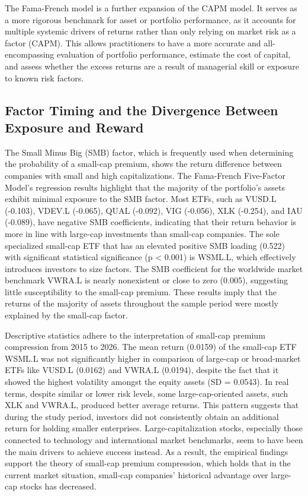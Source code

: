 \documentclass[12pt]{article}
\begin{document}
The Fama-French model is a further expansion of the CAPM model. It serves as a more rigorous benchmark for asset or portfolio performance, as it accounts for multiple systemic drivers of returns rather than only relying on market risk as a factor (CAPM). This allows practitioners to have a more accurate and all-encompassing evaluation of portfolio performance, estimate the cost of capital, and assess whether the excess returns are a result of managerial skill or exposure to known risk factors.


\subsection{Factor Timing and the Divergence Between Exposure and Reward}

The Small Minus Big (SMB) factor, which is frequently used when determining the probability of a small-cap premium, shows the return difference between companies with small and high capitalizations. The Fama-French Five-Factor Model's regression results highlight that the majority of the portfolio's assets exhibit minimal exposure to the SMB factor. Most ETFs, such as VUSD.L (-0.103), VDEV.L (-0.065), QUAL (-0.092), VIG (-0.056), XLK (-0.254), and IAU (-0.089), have negative SMB coefficients, indicating that their return behavior is more in line with large-cap investments than small-cap companies. The sole specialized small-cap ETF that has an elevated positive SMB loading (0.522) with significant statistical significance (p < 0.001) is WSML.L, which effectively introduces investors to size factors. The SMB coefficient for the worldwide market benchmark VWRA.L is nearly nonexistent or close to zero (0.005), suggesting little susceptibility to the small-cap premium. These results imply that the returns of the majority of assets throughout the sample period were mostly explained by the small-cap factor.

Descriptive statistics adhere to the interpretation of small-cap premium compression from 2015 to 2026. The mean return (0.0159) of the small-cap ETF WSML.L was not significantly higher in comparison of large-cap or broad-market ETFs like VUSD.L (0.0162) and VWRA.L (0.0194), despite the fact that it showed the highest volatility amongst the equity assets (SD = 0.0543). In real terms, despite similar or lower risk levels, some large-cap-oriented assets, such XLK and VWRA.L, produced better average returns. This pattern suggests that during the study period, investors did not consistently obtain an additional return for holding smaller enterprises. Large-capitalization stocks, especially those connected to technology and international market benchmarks, seem to have been the main drivers to achieve success instead. As a result, the empirical findings support the theory of small-cap premium compression, which holds that in the current market situation, small-cap companies' historical advantage over large-cap stocks has decreased.
\end{document}
